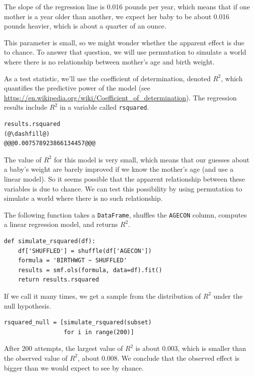 The slope of the regression line is 0.016 pounds per year, which means
that if one mother is a year older than another, we expect her baby to
be about 0.016 pounds heavier, which is about a quarter of an ounce.

This parameter is small, so we might wonder whether the apparent effect
is due to chance. To answer that question, we will use permutation to
simulate a world where there is no relationship between mother's age and
birth weight.

As a test statistic, we'll use the coefficient of determination, denoted
\(R^2\), which quantifies the predictive power of the model (see
\url{https://en.wikipedia.org/wiki/Coefficient_of_determination}). The
regression results include \(R^2\) in a variable called
\passthrough{\lstinline!rsquared!}.

\begin{lstlisting}[]
results.rsquared
(@\dashfill@)
@@@0.007578923866134457@@@
\end{lstlisting}

The value of \(R^2\) for this model is very small, which means that our
guesses about a baby's weight are barely improved if we know the
mother's age (and use a linear model). So it seems possible that the
apparent relationship between these variables is due to chance. We can
test this possibility by using permutation to simulate a world where
there is no such relationship.

The following function takes a \passthrough{\lstinline!DataFrame!},
shuffles the \passthrough{\lstinline!AGECON!} column, computes a linear
regression model, and returns \(R^2\).

\begin{lstlisting}[]
def simulate_rsquared(df):
    df['SHUFFLED'] = shuffle(df['AGECON'])
    formula = 'BIRTHWGT ~ SHUFFLED'
    results = smf.ols(formula, data=df).fit()
    return results.rsquared
\end{lstlisting}

If we call it many times, we get a sample from the distribution of
\(R^2\) under the null hypothesis.

\begin{lstlisting}[]
rsquared_null = [simulate_rsquared(subset)
                 for i in range(200)]
\end{lstlisting}

After 200 attempts, the largest value of \(R^2\) is about 0.003, which
is smaller than the observed value of \(R^2\), about 0.008. We conclude
that the observed effect is bigger than we would expect to see by
chance.

